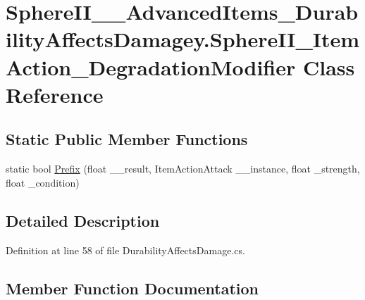 \hypertarget{class_sphere_i_i_____advanced_items___durability_affects_damagey_1_1_sphere_i_i___item_action___degradation_modifier}{}\section{Sphere\+I\+I\+\_\+\+\_\+\+Advanced\+Items\+\_\+\+Durability\+Affects\+Damagey.\+Sphere\+I\+I\+\_\+\+Item\+Action\+\_\+\+Degradation\+Modifier Class Reference}
\label{class_sphere_i_i_____advanced_items___durability_affects_damagey_1_1_sphere_i_i___item_action___degradation_modifier}
\subsection*{Static Public Member Functions}
\begin{DoxyCompactItemize}
\item 
static bool \mbox{\hyperlink{class_sphere_i_i_____advanced_items___durability_affects_damagey_1_1_sphere_i_i___item_action___degradation_modifier_add9ea31a7e3d40fdeac2c12e96d6208c}{Prefix}} (float \+\_\+\+\_\+result, Item\+Action\+Attack \+\_\+\+\_\+instance, float \+\_\+strength, float \+\_\+condition)
\end{DoxyCompactItemize}


\subsection{Detailed Description}


Definition at line 58 of file Durability\+Affects\+Damage.\+cs.



\subsection{Member Function Documentation}
\mbox{\label{class_sphere_i_i_____advanced_items___durability_affects_damagey_1_1_sphere_i_i___item_action___degradation_modifier_add9ea31a7e3d40fdeac2c12e96d6208c}} 
